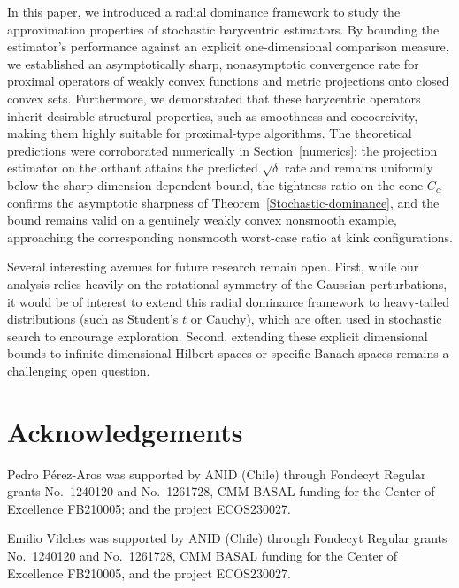 \documentclass[11pt]{article}
\newcommand{\1}{\mathds{1}}
\theoremstyle{definition}
\theoremstyle{remark}
\theoremstyle{definition}
\begin{document}
In this paper, we introduced a radial dominance framework to study the approximation properties of stochastic barycentric estimators. By bounding the estimator's performance against an explicit one-dimensional comparison measure, we established an asymptotically sharp, nonasymptotic convergence rate for proximal operators of weakly convex functions and metric projections onto closed convex sets. Furthermore, we demonstrated that these barycentric operators inherit desirable structural properties, such as smoothness and cocoercivity, making them highly suitable for proximal-type algorithms. The theoretical predictions were corroborated numerically in Section~\ref{numerics}: the projection estimator on the orthant attains the predicted $\sqrt\delta$ rate and remains uniformly below the sharp dimension-dependent bound, the tightness ratio on the cone $C_\alpha$ confirms the asymptotic sharpness of Theorem~\ref{Stochastic-dominance}, and the bound remains valid on a genuinely weakly convex nonsmooth example, approaching the corresponding nonsmooth worst-case ratio at kink configurations.

Several interesting avenues for future research remain open. First, while our analysis relies heavily on the rotational symmetry of the Gaussian perturbations, it would be of interest to extend this radial dominance framework to heavy-tailed distributions (such as Student's $t$ or Cauchy), which are often used in stochastic search to encourage exploration. Second, extending these explicit dimensional bounds to infinite-dimensional Hilbert spaces or specific Banach spaces remains a challenging open question.







\section*{Acknowledgements}


Pedro P\'erez-Aros was supported by ANID (Chile) through Fondecyt Regular grants No.~1240120 and No.~1261728, CMM BASAL funding for the Center of Excellence FB210005; and the project ECOS230027. 

Emilio Vilches was supported by ANID (Chile) through Fondecyt Regular grants No.~1240120 and No.~1261728, CMM BASAL funding for the Center of Excellence FB210005, and the project ECOS230027.














\end{document}
